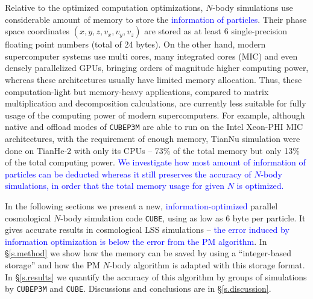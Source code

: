 \documentclass[10pt,twocolumn,preprint]{emulateapj}
\newcommand{\tcb}{\textcolor{blue}}
\begin{document}
Relative to the optimized computation optimizations, $N$-body simulations use considerable amount of memory to store the \tcb{information of particles}. Their phase space coordinates $(x,y,z,v_x,v_y,v_z)$ are stored as at least 6 single-precision floating point numbers (total of 24 bytes). On the other hand, modern supercomputer systems use multi cores, many integrated cores (MIC) and even densely parallelized GPUs, bringing orders of magnitude higher computing power, whereas these architectures usually have limited memory allocation. Thus, these computation-light but memory-heavy applications, compared to matrix multiplication and decomposition calculations, are currently less suitable for fully usage of the computing power of modern supercomputers. For example, although native and offload modes of {\tt CUBEP3M} are able to run on the Intel Xeon-PHI MIC architectures, with the requirement of enough memory, TianNu simulation were done on TianHe-2 with only its CPUs -- 73\% of the total memory but only 13\% of the total computing power. \tcb{We investigate how most amount of information of particles can be deducted whereas it still preserves the accuracy of $N$-body simulations, in order that the total memory usage for given $N$ is optimized.}

In the following sections we present a new, \tcb{information-optimized} parallel cosmological $N$-body simulation code {\tt CUBE}, using as low as 6 byte per particle. It gives accurate results in cosmological LSS simulations -- \tcb{the error induced by information optimization is below the error from the PM algorithm}. In \S\ref{s.method} we show how the memory can be saved by using a ``integer-based storage'' and how the PM $N$-body algorithm is adapted with this storage format. In \S\ref{s.results} we quantify the accuracy of this algorithm by groups of simulations by {\tt CUBEP3M} and {\tt CUBE}. Discussions and conclusions are in \S\ref{s.discussion}.
\end{document}

